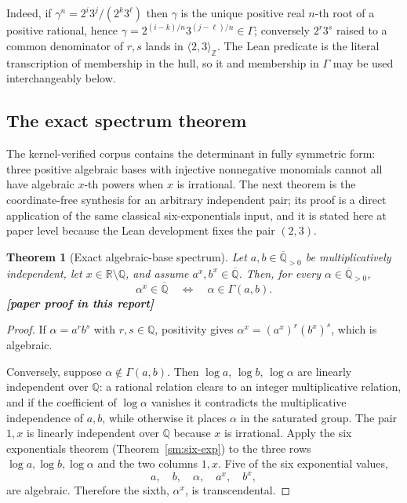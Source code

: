 \documentclass[11pt,oneside]{article}
\newtheorem{theorem}{Theorem}[section]
\theoremstyle{definition}
\theoremstyle{remark}
\newcommand{\Z}{\mathbb Z}
\newcommand{\Q}{\mathbb Q}
\newcommand{\R}{\mathbb R}
\newcommand{\Abar}{\overline{\mathbb Q}}
\newcommand{\Apos}{\Abar_{>0}}
\newcommand{\GammaSat}{\Gamma}
\newcommand{\Qbar}{\Abar}
\newcommand{\lean}[1]{\texttt{\detokenize{#1}}}
\newcommand{\statusnew}{\textcolor{newgreen}{\textbf{[paper proof in this report]}}}
\begin{document}
Indeed, if $\gamma^{n}=2^{i}3^{j}/(2^{k}3^{\ell})$ then $\gamma$ is the unique positive real
$n$-th root of a positive rational, hence $\gamma=2^{(i-k)/n}3^{(j-\ell)/n}\in\GammaSat$;
conversely $2^{r}3^{s}$ raised to a common denominator of $r,s$ lands in
$\langle2,3\rangle_{\Z}$.  The Lean predicate \lean{HasPositiveTwoThreeUnitPower} is the
literal transcription of membership in the hull, so it and membership in $\GammaSat$ may be
used interchangeably below.

\subsection{The exact spectrum theorem}

The kernel-verified corpus contains the determinant in fully symmetric form: three positive
algebraic bases with injective nonnegative monomials cannot all have algebraic $x$-th powers
when $x$ is irrational.  The next theorem is the coordinate-free synthesis for an arbitrary
independent pair; its proof is a direct application of the same classical six-exponentials
input, and it is stated here at paper level because the Lean development fixes the pair
$(2,3)$.

\begin{theorem}[Exact algebraic-base spectrum]\label{sp:general-spectrum}
Let $a,b\in\Apos$ be multiplicatively independent, let $x\in\R\setminus\Q$, and assume
$a^{x},b^{x}\in\Qbar$.  Then, for every $\alpha\in\Apos$,
\[
  \alpha^{x}\in\Qbar
  \quad\Longleftrightarrow\quad
  \alpha\in\GammaSat(a,b).
\]
\statusnew
\end{theorem}

\begin{proof}
If $\alpha=a^{r}b^{s}$ with $r,s\in\Q$, positivity gives $\alpha^{x}=(a^{x})^{r}(b^{x})^{s}$,
which is algebraic.

Conversely, suppose $\alpha\notin\GammaSat(a,b)$.  Then $\log a$, $\log b$, $\log\alpha$ are
linearly independent over $\Q$: a rational relation clears to an integer multiplicative
relation, and if the coefficient of $\log\alpha$ vanishes it contradicts the multiplicative
independence of $a,b$, while otherwise it places $\alpha$ in the saturated group.  The pair
$1,x$ is linearly independent over $\Q$ because $x$ is irrational.  Apply the six
exponentials theorem (Theorem~\ref{sm:six-exp}) to the three rows $\log a,\log b,\log\alpha$
and the two columns $1,x$.  Five of the six exponential values,
\[
  a,\quad b,\quad \alpha,\quad a^{x},\quad b^{x},
\]
are algebraic.  Therefore the sixth, $\alpha^{x}$, is transcendental.
\end{proof}
\end{document}
